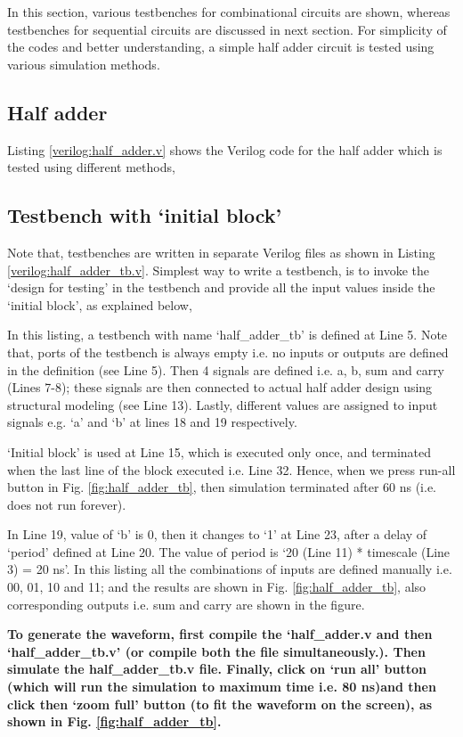 In this section, various testbenches for combinational circuits are shown, whereas testbenches for sequential circuits are discussed in next section. For simplicity of the codes and better understanding, a simple half adder circuit is tested using various simulation methods. 

\subsection{Half adder}
Listing \ref{verilog:half_adder.v} shows the Verilog code for the half adder which is tested using different methods, 


%
%
\subsection{Testbench with `initial block'}

Note that, testbenches are written in separate Verilog files as shown in Listing \ref{verilog:half_adder_tb.v}. Simplest way to write a testbench, is to invoke the `design for testing' in the testbench and provide all the input values inside the `initial block', as explained below, 

\begin{explanation}
	In this listing, a testbench with name `half\_adder\_tb' is defined at Line 5. Note that, ports of the testbench is always empty i.e. no inputs or outputs are defined in the definition (see Line 5). Then 4 signals are defined i.e. a, b, sum and carry (Lines 7-8); these signals are then connected to actual half adder design using structural modeling (see Line 13). Lastly, different values are assigned to input signals e.g. `a' and `b' at lines 18 and 19 respectively. 
	
	\begin{noNumBox}
		`Initial block' is used at Line 15, which is executed only once, and terminated when the last line of the block executed i.e. Line 32. Hence, when we press run-all button in Fig. \ref{fig:half_adder_tb}, then simulation terminated after 60 ns (i.e. does not run forever). 
	\end{noNumBox}
	In Line 19, value of `b' is 0, then it changes to `1' at Line 23, after a delay of `period' defined at Line 20. The value of period is `20 (Line 11) * timescale (Line 3) = 20 ns'. In this listing all the combinations of inputs are defined manually i.e. 00, 01, 10 and 11; and the results are shown in Fig. \ref{fig:half_adder_tb}, also corresponding outputs i.e. sum and carry are shown in the figure. 
	
	\textbf{To generate the waveform, first compile the `half\_adder.v and then `half\_adder\_tb.v' (or compile both the file simultaneously.). Then simulate the half\_adder\_tb.v file. Finally, click on `run all' button (which will run the simulation to maximum time i.e. 80 ns)and then click then `zoom full' button (to fit the waveform on the screen), as shown in Fig. \ref{fig:half_adder_tb}.}
\end{explanation}

